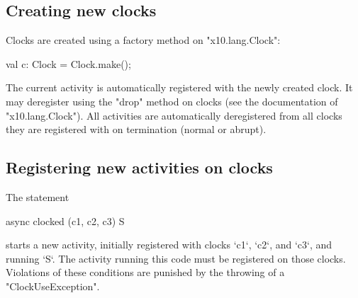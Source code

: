 \subsection{Creating new clocks}\label{sec:clock:create}

Clocks are created using a factory method on \xcd"x10.lang.Clock":


\begin{xten}
val c: Clock = Clock.make();
\end{xten}


The current activity is automatically registered with the newly
created clock.  It may deregister using the \xcd"drop" method on
clocks (see the documentation of \xcd"x10.lang.Clock"). All activities
are automatically deregistered from all clocks they are registered
with on termination (normal or abrupt).

\subsection{Registering new activities on clocks}
\label{sec:clock:register}

The statement 

\begin{xten}
  async clocked (c1, c2, c3) S
\end{xten}
starts a new activity, initially registered with
clocks \xcd`c1`, \xcd`c2`, and \xcd`c3`, and  running \xcd`S`. The activity running this code must
be registered on those clocks. 
Violations of these conditions are punished by the throwing of a
\xcd"ClockUseException". 


